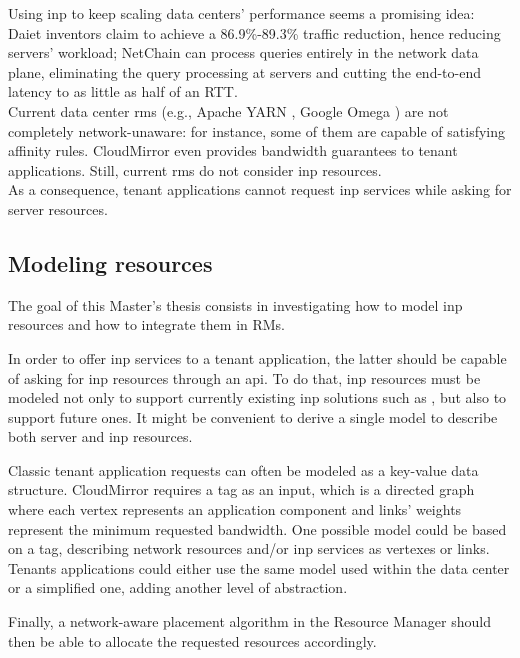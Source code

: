 Using \gls{inp} to keep scaling data centers' performance seems a promising idea: Daiet \cite{daiet} inventors claim to achieve a 86.9\%-89.3\% traffic reduction, hence reducing servers' workload; NetChain \cite{netchain} can process queries entirely in the network data plane, eliminating the query processing at servers and cutting the end-to-end latency to as little as half of an RTT.\\
Current data center \glspl{rm} (e.g., Apache YARN \cite{yarn}, Google Omega \cite{omega}) are not completely network-unaware: for instance, some of them are capable of satisfying affinity rules. CloudMirror \cite{cloudmirror} even provides bandwidth guarantees to tenant applications. Still, current \glspl{rm} do not consider \gls{inp} resources.\\
As a consequence, tenant applications cannot request \gls{inp} services while asking for server resources.

\subsection{Modeling \texorpdfstring{}{INP} resources}
The goal of this Master's thesis consists in investigating how to model \gls{inp} resources and how to integrate them in RMs.\par
In order to offer \gls{inp} services to a tenant application, the latter should be capable of asking for \gls{inp} resources through an \gls{api}. To do that, \gls{inp} resources must be modeled not only to support currently existing \gls{inp} solutions such as \cite{daiet} \cite{netchain} \cite{incbricks} \cite{sharp}, but also to support future ones. It might be convenient to derive a single model to describe both server and \gls{inp} resources.\par
Classic tenant application requests can often be modeled as a key-value data structure. CloudMirror \cite{cloudmirror} requires a \gls{tag} as an input, which is a directed graph where each vertex represents an application component and links' weights represent the minimum requested bandwidth. One possible model could be based on a \gls{tag}, describing network resources and/or \gls{inp} services as vertexes or links. Tenants applications could either use the same model used within the data center or a simplified one, adding another level of abstraction.\par
Finally, a network-aware placement algorithm in the Resource Manager should then be able to allocate the requested resources accordingly.